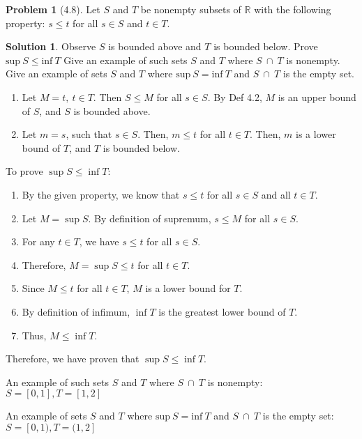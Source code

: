 \documentclass[12pt]{article}
\theoremstyle{definition} %
\newtheorem{solution}{Solution}
\newtheorem{problem}{Problem}
\theoremstyle{plain} %
\begin{document}
\begin{problem}[4.8]
 Let $S$ and $T$ be nonempty subsets of $\mathbb{R}$ with the following property:
$s\leq t$ for all $s \in S$ and $t \in T$.

   
\end{problem}
\begin{solution}
         Observe $S$ is bounded above and $T$ is bounded below.
         Prove $\text{sup}\ S \leq \text{inf}\ T$
         Give an example of such sets $S$ and $T$ where $S \ \cap \ T$ is nonempty.
         Give an example of sets $S$ and $T$ where $\text{sup}\ S = \text{inf}\ T$ and $S \ \cap \ T$ is the empty set.

    

        \begin{enumerate}
            \item Let $M=t,\ t \in T$. Then $S\leq M$ for all $s\in S$. By Def 4.2, $M$ is an upper bound of $S$, and $S$ is bounded above.
            \item Let $m=s$, such that $s\in S$. Then, $m\leq t$ for all $t \in T$. Then, $m$ is a lower bound of $T$, and $T$ is bounded below.
        \end{enumerate}
        
     To prove $\sup S \leq \inf T$:
        \begin{enumerate}
            \item By the given property, we know that $s \leq t$ for all $s \in S$ and all $t \in T$.
            \item Let $M = \sup S$. By definition of supremum, $s \leq M$ for all $s \in S$.
            \item For any $t \in T$, we have $s \leq t$ for all $s \in S$.
            \item Therefore, $M = \sup S \leq t$ for all $t \in T$.
            \item Since $M \leq t$ for all $t \in T$, $M$ is a lower bound for $T$.
            \item By definition of infimum, $\inf T$ is the greatest lower bound of $T$.
            \item Thus, $M \leq \inf T$.
        \end{enumerate}
        Therefore, we have proven that $\sup S \leq \inf T$. 
    
        
         An example of such sets $S$ and $T$ where $S \ \cap \ T$ is nonempty: $S=[0,1], T=[1,2]$
        
       An example of sets $S$ and $T$ where $\text{sup}\ S = \text{inf}\ T$ and $S \ \cap \ T$ is the empty set: $S=[0,1), T=(1,2]$
    
\end{solution}
\end{document}
